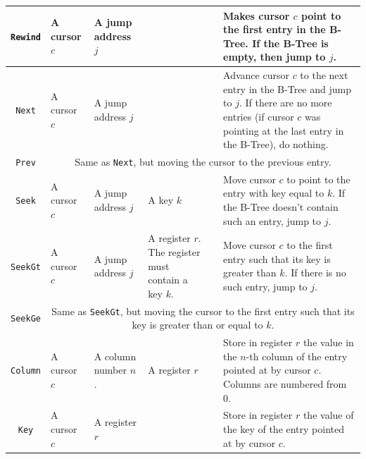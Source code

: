 \documentclass[10pt]{article}
\begin{document}
\begin{landscape}
\begin{longtable}{|c|p{3cm}|p{3cm}|p{3cm}|p{3cm}|p{4cm}|}
\texttt{Rewind} & 
A cursor $c$ & 
A jump address $j$ & 
\cellcolor[gray]{0.9} &
\cellcolor[gray]{0.9} &
Makes cursor $c$ point to the first entry in the B-Tree. If the B-Tree is empty, then jump to $j$. \\\hline

\texttt{Next} & 
A cursor $c$ & 
A jump address $j$ & 
\cellcolor[gray]{0.9} &
\cellcolor[gray]{0.9} &
Advance cursor $c$ to the next entry in the B-Tree and jump to $j$. If there are no more entries (if cursor $c$ was pointing at the last entry in the B-Tree), do nothing. \\\hline

\texttt{Prev} & 
\multicolumn{5}{c|}{Same as \texttt{Next}, but moving the cursor to the previous entry.} \\\hline

\texttt{Seek} & 
A cursor $c$ & 
A jump address $j$ & 
A key $k$ &
\cellcolor[gray]{0.9} &
Move cursor $c$ to point to the entry with key equal to $k$. If the B-Tree doesn't contain such an entry, jump to $j$. \\\hline

\texttt{SeekGt} & 
A cursor $c$ & 
A jump address $j$ & 
A register $r$. The register must contain a key $k$. &
\cellcolor[gray]{0.9} &
Move cursor $c$ to the first entry such that its key is greater than $k$. If there is no such entry, jump to $j$. \\\hline

\texttt{SeekGe} & 
\multicolumn{5}{c|}{Same as \texttt{SeekGt}, but moving the cursor to the first entry such that its key is greater than or equal to $k$.} \\\hline

%
%

\texttt{Column} & 
A cursor $c$ & 
A column number $n$.& 
A register $r$ &
\cellcolor[gray]{0.9} &
Store in register $r$ the value in the $n$-th column of the entry pointed at by cursor $c$. Columns are numbered from 0. \\\hline

\texttt{Key} & 
A cursor $c$ & 
A register $r$ &
\cellcolor[gray]{0.9} &
\cellcolor[gray]{0.9} &
Store in register $r$ the value of the key of the entry pointed at by cursor $c$.\\\hline

%
%


\end{longtable}
\end{landscape}
\end{document}
